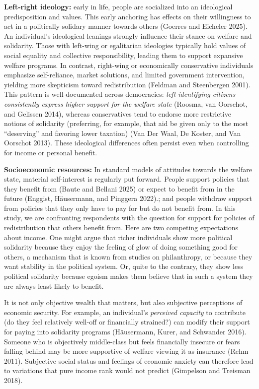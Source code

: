 \documentclass[12pt]{article}
\begin{document}
\textbf{Left-right ideology:} early in life, people are socialized into
an ideological predisposition and values. This early anchoring has
effects on their willingness to act in a politically solidary manner
towards others (Goerres and Eicheler 2025). An individual's ideological
leanings strongly influence their stance on welfare and solidarity.
Those with left-wing or egalitarian ideologies typically hold values of
social equality and collective responsibility, leading them to support
expansive welfare programs. In contrast, right-wing or economically
conservative individuals emphasize self-reliance, market solutions, and
limited government intervention, yielding more skepticism toward
redistribution (Feldman and Steenbergen 2001). This pattern is
well-documented across democracies: \emph{left-identifying citizens
consistently express higher support for the welfare state} (Roosma, van
Oorschot, and Gelissen 2014), whereas conservatives tend to endorse more
restrictive notions of solidarity (preferring, for example, that aid be
given only to the most ``deserving'' and favoring lower taxation) (Van
Der Waal, De Koster, and Van Oorschot 2013). These ideological
differences often persist even when controlling for income or personal
benefit.

\textbf{Socioeconomic resources:} In standard models of attitudes
towards the welfare state, material self-interest is regularly put
forward. People support policies that they benefit from (Baute and
Bellani 2025) or expect to benefit from in the future (Enggist,
Häusermann, and Pinggera 2022).; and people withdraw support from
policies that they only have to pay for but do not benefit from. In this
study, we are confronting respondents with the question for support for
policies of redistribution that others benefit from. Here are two
competing expectations about income. One might argue that richer
individuals show more political solidarity because they enjoy the
feeling of glow of doing something good for others, a mechanism that is
known from studies on philanthropy, or because they want stability in
the political system. Or, quite to the contrary, they show less
political solidarity because egoism makes them believe that in such a
system they are always least likely to benefit.

It is not only objective wealth that matters, but also subjective
perceptions of economic security. For example, an individual's
\emph{perceived capacity} to contribute (do they feel relatively
well-off or financially strained?) can modify their support for paying
into solidarity programs (Häusermann, Kurer, and Schwander 2016).
Someone who is objectively middle-class but feels financially insecure
or fears falling behind may be more supportive of welfare viewing it as
insurance (Rehm 2011). Subjective social status and feelings of economic
anxiety can therefore lead to variations that pure income rank would not
predict (Gimpelson and Treisman 2018).
\end{document}

